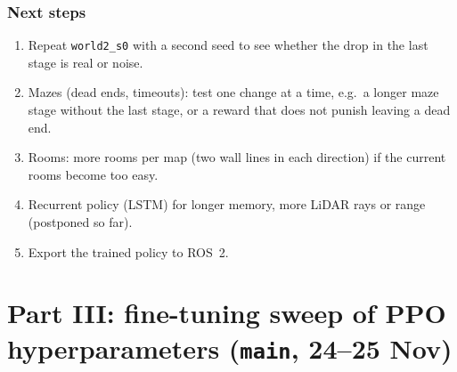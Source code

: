 \documentclass[11pt,a4paper]{article}
\newcommand{\code}[1]{\texttt{#1}}
\begin{document}
\section{Next steps}
\begin{enumerate}[leftmargin=*]
      \item Repeat \code{world2\_s0} with a second seed to see whether the drop in the
            last stage is real or noise.
      \item Mazes (dead ends, timeouts): test one change at a time, e.g.\ a longer
            maze stage without the last stage, or a reward that does not punish
            leaving a dead end.
      \item Rooms: more rooms per map (two wall lines in each direction) if the
            current rooms become too easy.
      \item Recurrent policy (LSTM) for longer memory, more LiDAR rays or range
            (postponed so far).
      \item Export the trained policy to ROS~2.
\end{enumerate}

\clearpage
\part*{Part III: fine-tuning sweep of PPO hyperparameters (\code{main}, 24--25 Nov)}

\end{document}
